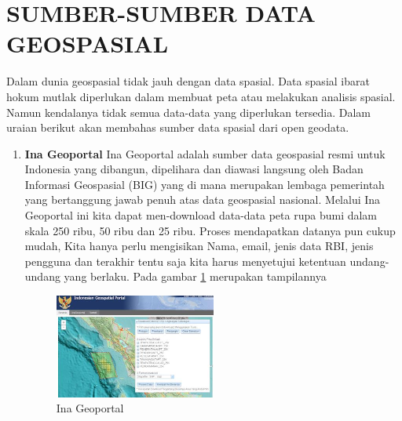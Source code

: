 \section{SUMBER-SUMBER DATA GEOSPASIAL}

Dalam dunia geospasial tidak jauh dengan data spasial. Data spasial ibarat hokum mutlak diperlukan dalam membuat peta atau melakukan analisis spasial. Namun kendalanya tidak semua data-data yang diperlukan tersedia. Dalam uraian berikut akan membahas sumber data spasial dari open geodata.
\begin{enumerate}
\item \textbf{Ina Geoportal}
\subitem Ina Geoportal adalah sumber data geospasial resmi untuk Indonesia yang  dibangun, dipelihara dan diawasi langsung oleh Badan Informasi Geospasial (BIG) yang di mana merupakan lembaga pemerintah yang bertanggung jawab penuh atas data geospasial nasional. Melalui Ina Geoportal ini kita dapat men-download data-data peta rupa bumi dalam skala 250 ribu, 50 ribu dan 25 ribu. Proses mendapatkan datanya pun cukup mudah, Kita hanya perlu mengisikan Nama, email, jenis data RBI, jenis pengguna dan terakhir tentu saja kita harus menyetujui ketentuan undang-undang yang berlaku. Pada gambar \ref{labelgambar1} merupakan tampilannya  
\begin{figure}[ht]
\centering
\includegraphics[width=0.5\textwidth]{pictures/ina_geospasial}
\caption{Ina Geoportal}
\label{labelgambar1}
\end{figure}


\end{enumerate}
